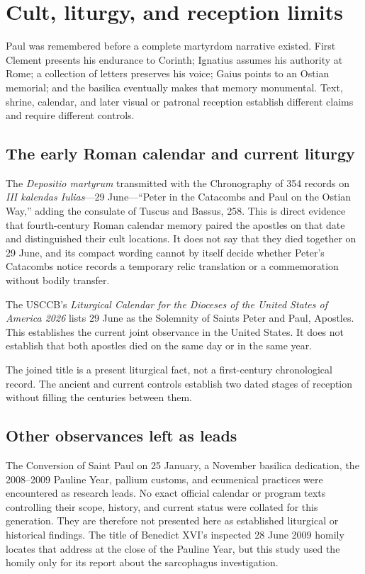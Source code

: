 \section{Cult, liturgy, and reception limits}\label{sec:paul-cult}

Paul was remembered before a complete martyrdom narrative existed. First
Clement presents his endurance to Corinth; Ignatius assumes his authority at
Rome; a collection of letters preserves his voice; Gaius points to an Ostian
memorial; and the basilica eventually makes that memory monumental. Text,
shrine, calendar, and later visual or patronal reception establish different
claims and require different controls.

\subsection{The early Roman calendar and current liturgy}

The \emph{Depositio martyrum} transmitted with the Chronography of 354 records
on \emph{III kalendas Iulias}---29 June---``Peter in the Catacombs and Paul on
the Ostian Way,'' adding the consulate of Tuscus and Bassus, 258. This is direct
evidence that fourth-century Roman calendar memory paired the apostles on that
date and distinguished their cult locations. It does not say that they died
together on 29 June, and its compact wording cannot by itself decide whether
Peter's Catacombs notice records a temporary relic translation or a
commemoration without bodily transfer.

The USCCB's \emph{Liturgical Calendar for the Dioceses of the United States of
America 2026} lists 29 June as the Solemnity of Saints Peter and Paul,
Apostles. This establishes the current joint observance in the United States.
It does not establish that both apostles died on the same day or in the same
year.

The joined title is a present liturgical fact, not a first-century
chronological record. The ancient and current controls establish two dated
stages of reception without filling the centuries between them.

\subsection{Other observances left as leads}

The Conversion of Saint Paul on 25 January, a November basilica dedication,
the 2008--2009 Pauline Year, pallium customs, and ecumenical practices were
encountered as research leads. No exact official calendar or program texts
controlling their scope, history, and current status were collated for this
generation. They are therefore not presented here as established liturgical
or historical findings. The title of Benedict XVI's inspected 28 June 2009
homily locates that address at the close of the Pauline Year, but this study
used the homily only for its report about the sarcophagus investigation.

